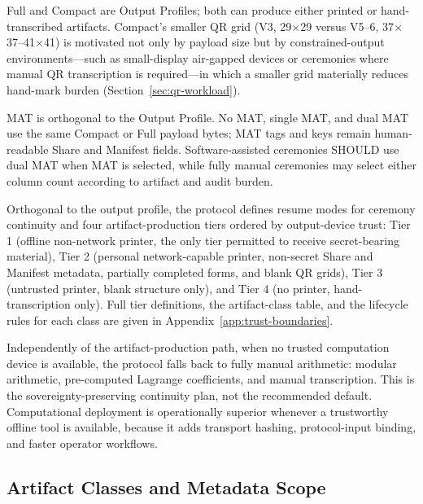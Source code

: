 \documentclass[11pt]{article}
\begin{document}
Full and Compact are Output Profiles; both can produce either printed or hand-transcribed artifacts. Compact's smaller QR grid (V3, 29$\times$29 versus V5--6, 37$\times$37--41$\times$41) is motivated not only by payload size but by constrained-output environments---such as small-display air-gapped devices or ceremonies where manual QR transcription is required---in which a smaller grid materially reduces hand-mark burden (Section~\ref{sec:qr-workload}).

MAT is orthogonal to the Output Profile. No MAT, single MAT, and dual MAT use the same Compact or Full payload bytes; MAT tags and keys remain human-readable Share and Manifest fields. Software-assisted ceremonies SHOULD use dual MAT when MAT is selected, while fully manual ceremonies may select either column count according to artifact and audit burden.

Orthogonal to the output profile, the protocol defines resume modes for ceremony continuity and four artifact-production tiers ordered by output-device trust: Tier 1 (offline non-network printer, the only tier permitted to receive secret-bearing material), Tier 2 (personal network-capable printer, non-secret Share and Manifest metadata, partially completed forms, and blank QR grids), Tier 3 (untrusted printer, blank structure only), and Tier 4 (no printer, hand-transcription only). Full tier definitions, the artifact-class table, and the lifecycle rules for each class are given in Appendix~\ref{app:trust-boundaries}.

Independently of the artifact-production path, when no trusted computation device is available, the protocol falls back to fully manual arithmetic: modular arithmetic, pre-computed Lagrange coefficients, and manual transcription. This is the sovereignty-preserving continuity plan, not the recommended default. Computational deployment is operationally superior whenever a trustworthy offline tool is available, because it adds transport hashing, protocol-input binding, and faster operator workflows.

\subsection{Artifact Classes and Metadata Scope}
\label{sec:artifact-boundary}
\end{document}
